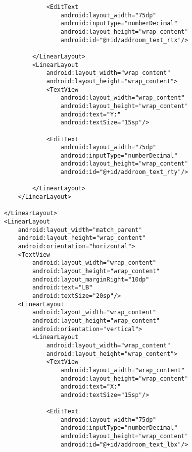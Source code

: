 \begin{lstlisting}
                        <EditText
                            android:layout_width="75dp"
                            android:inputType="numberDecimal"
                            android:layout_height="wrap_content"
                            android:id="@+id/addroom_text_rtx"/>

                    </LinearLayout>
                    <LinearLayout
                        android:layout_width="wrap_content"
                        android:layout_height="wrap_content">
                        <TextView
                            android:layout_width="wrap_content"
                            android:layout_height="wrap_content"
                            android:text="Y:"
                            android:textSize="15sp"/>

                        <EditText
                            android:layout_width="75dp"
                            android:inputType="numberDecimal"
                            android:layout_height="wrap_content"
                            android:id="@+id/addroom_text_rty"/>

                    </LinearLayout>
                </LinearLayout>

            </LinearLayout>
            <LinearLayout
                android:layout_width="match_parent"
                android:layout_height="wrap_content"
                android:orientation="horizontal">
                <TextView
                    android:layout_width="wrap_content"
                    android:layout_height="wrap_content"
                    android:layout_marginRight="10dp"
                    android:text="LB"
                    android:textSize="20sp"/>
                <LinearLayout
                    android:layout_width="wrap_content"
                    android:layout_height="wrap_content"
                    android:orientation="vertical">
                    <LinearLayout
                        android:layout_width="wrap_content"
                        android:layout_height="wrap_content">
                        <TextView
                            android:layout_width="wrap_content"
                            android:layout_height="wrap_content"
                            android:text="X:"
                            android:textSize="15sp"/>

                        <EditText
                            android:layout_width="75dp"
                            android:inputType="numberDecimal"
                            android:layout_height="wrap_content"
                            android:id="@+id/addroom_text_lbx"/>


\end{lstlisting}
